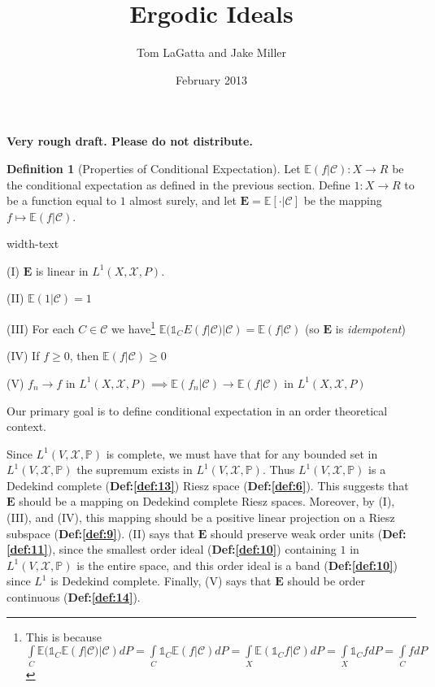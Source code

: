 \documentclass[letterpaper,10pt,oneside,onecolumn,reqno]{amsart}
\author{Tom LaGatta and Jake Miller}
\title{Ergodic Ideals}
\date{February 2013}
\newcommand{\C}{\mathcal C}
\newcommand{\E}{\mathbb E}
\renewcommand{\P}{\mathbb P}
\newcommand{\X}{\mathcal X}
\newcommand{\one}{\mathds{1}}      %
\theoremstyle{definition}
\newtheorem{defn}{Definition}
\begin{document}
\maketitle

\textbf{Very rough draft. Please do not distribute.}
\begin{defn}[Properties of Conditional Expectation]
  \label{def:1}
  Let $\E(f|\C) : X \to R$ be the conditional expectation as defined
  in the previous section. Define $1 : X \to R$ to be a function
  equal to $1$ almost surely, and let $\mathbf{E}=\E[\cdot|\C]$ be the
  mapping $f \mapsto \E(f|\C)$.
  \begin{deflist}{width-text}
  \item[(I)] $\mathbf{E}$ is linear in $L^1(X,\X,P)$.
  \item[(II)] $\E(1|\C) = 1$
  \item[(III)] For each $C \in \C$ we have\footnote{This is because
      $\int\limits_C\E(\one_C \E(f|\C)|\C)dP=\int\limits_C \one_C
      \E(f|\C)dP=\int\limits_X \E(\one_C f | \C)dP=\int\limits_X
      \one_C fdP=\int\limits_C fdP$ \label{fn:1}} $\E(\one_C
    E(f|\C)|\C) = \E(f|\C)$ (so $\mathbf{E}$ is \emph{idempotent})
  \item[(IV)] If $f \geq 0$, then $\E(f|\C) \geq 0$
  \item[(V)] $f_n \rightarrow f$ in $L^1(X,\X,P) \implies \E(f_n|\C)
    \rightarrow \E(f|\C)$ in $L^1(X,\X,P)$
  \end{deflist}
\end{defn}

Our primary goal is to define conditional expectation in an order
theoretical context.

\begin{framed}
  Since $L^1(V,\X,\P)$ is complete, we must have that for any bounded
  set in $L^1(V,\X,\P)$ the supremum exists in $L^1(V,\X,\P)$. Thus
  $L^1(V,\X,\P)$ is a Dedekind complete (\textbf{Def:\ref{def:13}})
  Riesz space (\textbf{Def:\ref{def:6}}). This suggests that
  $\mathbf{E}$ should be a mapping on Dedekind complete Riesz
  spaces. Moreover, by (I), (III), and (IV), this mapping should be a
  positive linear projection on a
  Riesz subspace (\textbf{Def:\ref{def:9}}). (II) says that
  $\mathbf{E}$ should preserve weak order units
  (\textbf{Def:\ref{def:11}}), since the smallest order ideal
  (\textbf{Def:\ref{def:10}}) containing $1$ in $L^1(V,\X,\P)$ is the
  entire space, and this order ideal is a band (\textbf{Def:\ref{def:10}})
  since $L^1$ is Dedekind complete. Finally, (V) says that
  $\mathbf{E}$ should be order continuous (\textbf{Def:\ref{def:14}}).
\end{framed}
\end{document}
